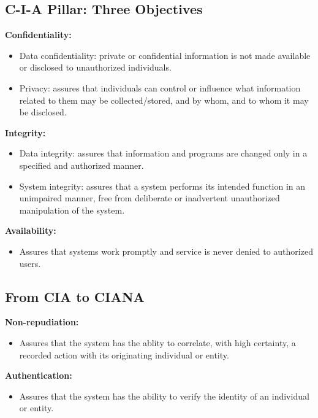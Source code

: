 \documentclass{math}
\begin{document}
\subsection*{C-I-A Pillar: Three Objectives}
\textbf{Confidentiality:}
\begin{itemize}
  \item Data confidentiality: private or confidential information is not made
  available or disclosed to unauthorized individuals.
  \item Privacy: assures that individuals can control or influence what
  information related to them may be collected/stored, and by whom, and to whom
  it may be disclosed.
\end{itemize}
\textbf{Integrity:}
\begin{itemize}
  \item Data integrity: assures that information and programs are changed only
  in a specified and authorized manner.
  \item System integrity: assures that a system performs its intended function
  in an unimpaired manner, free from deliberate or inadvertent unauthorized
  manipulation of the system.
\end{itemize}
\textbf{Availability:}
\begin{itemize}
  \item Assures that systems work promptly and service is never denied to
  authorized users.
\end{itemize}

\subsection*{From CIA to CIANA}
\textbf{Non-repudiation:}
\begin{itemize}
  \item Assures that the system has the ablity to correlate, with high
  certainty, a recorded action with its originating individual or entity.
\end{itemize}
\textbf{Authentication:}
\begin{itemize}
  \item Assures that the system has the ability to verify the identity of an
  individual or entity.
\end{itemize}
\end{document}

